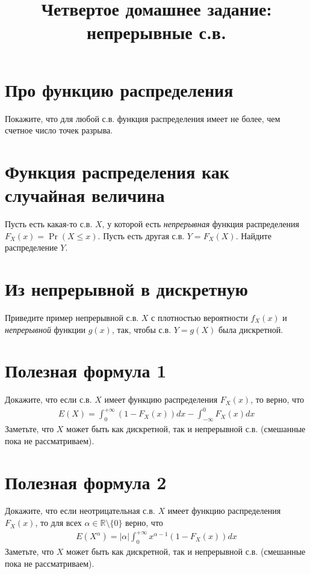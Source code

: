 \documentclass[12pt]{article}
\title{Четвертое домашнее задание: непрерывные с.в.}
\newcommand\R{\mathbb{R}}
\begin{document}
\maketitle

\section{Про функцию распределения}

Покажите, что для любой с.в. функция распределения имеет не более, чем счетное число точек разрыва.

\section{Функция распределения как случайная величина}

Пусть есть какая-то с.в. $X$, у которой есть \emph{непрерывная} функция распределения $F_X(x) = \Pr(X \le x)$. Пусть есть другая с.в. $Y = F_X(X)$. Найдите распределение $Y$.

\section{Из непрерывной в дискретную}

Приведите пример непрерывной с.в. $X$ с плотностью вероятности $f_X(x)$ и \emph{непрерывной} функции $g(x)$, так, чтобы с.в. $Y = g(X)$ была дискретной.

\section{Полезная формула 1}

Докажите, что если с.в. $X$ имеет функцию распределения $F_X(x)$, то верно, что
\begin{align*}
    E(X) = \int_0^{+\infty} \left(1 - F_X(x)\right)dx - \int_{-\infty}^0 F_X(x)dx
\end{align*}
Заметьте, что $X$ может быть как дискретной, так и непрерывной с.в. (смешанные пока не рассматриваем).


\section{Полезная формула 2}

Докажите, что если неотрицательная с.в. $X$ имеет функцию распределения $F_X(x)$, то для всех $\alpha \in \R \setminus \{0\}$ верно, что
\begin{align*}
    E(X^\alpha) = |\alpha| \int_0^{+\infty} x^{\alpha - 1}\left(1 - F_X(x)\right)dx
\end{align*}
Заметьте, что $X$ может быть как дискретной, так и непрерывной с.в. (смешанные пока не рассматриваем).
\end{document}
